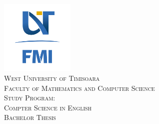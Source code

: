 \documentclass[12pt, a4paper]{report}
\begin{document}
	
	
	\begin{titlepage}
		
		\newcommand{\HRule}{\rule{\linewidth}{0.5mm}} %
		
		\center %
		
		
		\vspace{-20pt}
		\includegraphics[width=100pt]{FMI-03.png}\\[1.0cm] %
		
		\textsc{\LARGE West University of  Timisoara}\\[0.5cm] %
		\textsc{\Large Faculty of Mathematics and Computer Science}\\[0.5cm] %
		\textsc{\large Study Program: \\Compter Science in English}\\[3cm] %
		
		
		\textsc{\Huge Bachelor Thesis}\\[5cm]
		
		

\end{titlepage}
\end{document}
